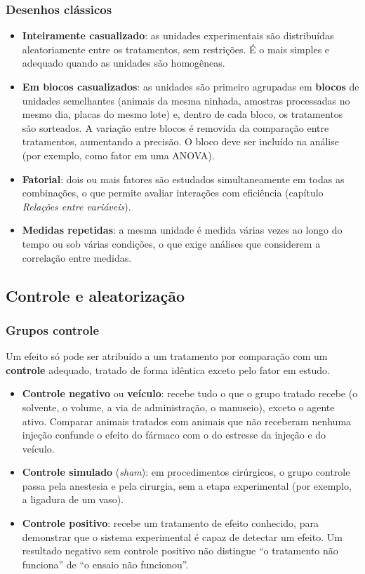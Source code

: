 \documentclass[
]{book}
\providecommand{\tightlist}{%
  \setlength{\itemsep}{0pt}\setlength{\parskip}{0pt}}
\begin{document}
\subsubsection{Desenhos clássicos}\label{desenhos-cluxe1ssicos}

\begin{itemize}
\tightlist
\item
  \textbf{Inteiramente casualizado}: as unidades experimentais são distribuídas aleatoriamente entre os tratamentos, sem restrições. É o mais simples e adequado quando as unidades são homogêneas.
\item
  \textbf{Em blocos casualizados}: as unidades são primeiro agrupadas em \textbf{blocos} de unidades semelhantes (animais da mesma ninhada, amostras processadas no mesmo dia, placas do mesmo lote) e, dentro de cada bloco, os tratamentos são sorteados. A variação entre blocos é removida da comparação entre tratamentos, aumentando a precisão. O bloco deve ser incluído na análise (por exemplo, como fator em uma ANOVA).
\item
  \textbf{Fatorial}: dois ou mais fatores são estudados simultaneamente em todas as combinações, o que permite avaliar interações com eficiência (capítulo \emph{Relações entre variáveis}).
\item
  \textbf{Medidas repetidas}: a mesma unidade é medida várias vezes ao longo do tempo ou sob várias condições, o que exige análises que considerem a correlação entre medidas.
\end{itemize}

\subsection{Controle e aleatorização}\label{controle-e-aleatorizauxe7uxe3o}

\subsubsection{Grupos controle}\label{grupos-controle}

Um efeito só pode ser atribuído a um tratamento por comparação com um \textbf{controle} adequado, tratado de forma idêntica exceto pelo fator em estudo.

\begin{itemize}
\tightlist
\item
  \textbf{Controle negativo} ou \textbf{veículo}: recebe tudo o que o grupo tratado recebe (o solvente, o volume, a via de administração, o manuseio), exceto o agente ativo. Comparar animais tratados com animais que não receberam nenhuma injeção confunde o efeito do fármaco com o do estresse da injeção e do veículo.
\item
  \textbf{Controle simulado} (\emph{sham}): em procedimentos cirúrgicos, o grupo controle passa pela anestesia e pela cirurgia, sem a etapa experimental (por exemplo, a ligadura de um vaso).
\item
  \textbf{Controle positivo}: recebe um tratamento de efeito conhecido, para demonstrar que o sistema experimental é capaz de detectar um efeito. Um resultado negativo sem controle positivo não distingue ``o tratamento não funciona'' de ``o ensaio não funcionou''.
\end{itemize}
\end{document}
